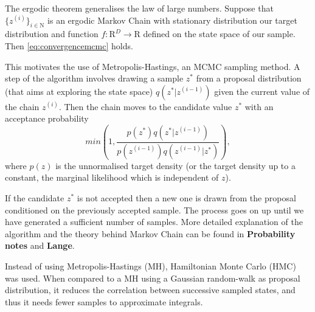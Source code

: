    The ergodic theorem generalises the law of large numbers. Suppose that $\{z^{(i)}\}_{i \in \mathrm{N}}$ is an ergodic Markov Chain with stationary distribution our target distribution and function $f:\mathrm{R}^D \rightarrow \mathrm{R}$ defined on the state space of our sample. Then \eqref{eq:convergencemcmc} holds.
   
   This motivates the use of Metropolis-Hastings, an MCMC sampling method. A step of the algorithm involves drawing a sample $z^*$ from a proposal distribution (that aims at exploring the state space) $q(z^*|z^{(i-1)})$ given the current value of the chain $z^{(i)}$. Then the chain moves to the candidate value $z^*$ with an acceptance probability 
   \begin{equation}
   	min\left( 1,\frac{p(z^*)q(z^*|z^{(i-1)})}{p(z^{(i-1)})q(z^{(i-1)}|z^*)}\right),
   \end{equation} 
   where $p(z)$ is the unnormalised target density (or the target density up to a constant, the marginal likelihood which is independent of $z$).
   
   If the candidate $z^*$ is not accepted then a new one is drawn from the proposal conditioned on the previously accepted sample. The process goes on up until we have generated a sufficient number of samples. More detailed explanation of the algorithm and the theory behind Markov Chain can be found in {\bf Probability notes} and {\bf Lange}.
   
	Instead of using Metropolis-Hastings (MH), Hamiltonian Monte Carlo (HMC) was used. When compared to a MH using a Gaussian random-walk as proposal distribution, it reduces the correlation between successive sampled states, and thus it needs fewer samples to approximate integrals.
	
	
	
   
%   
%   
%   	
%   
%   
   

